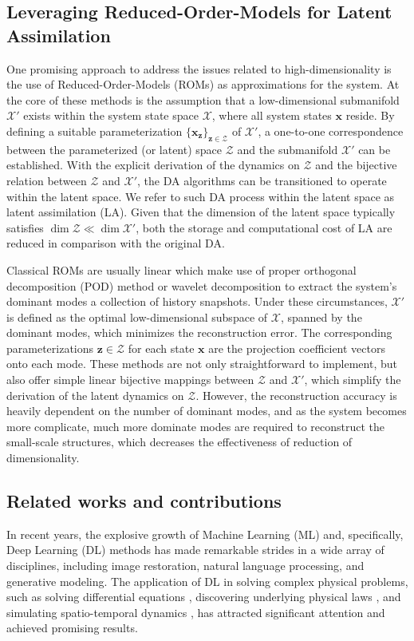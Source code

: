 \documentclass{article}
\newcommand{\mX}{\mathcal{X}}
\newcommand{\mZ}{\mathcal{Z}}
\begin{document}
\subsection{Leveraging Reduced-Order-Models for Latent Assimilation}
One promising approach to address the issues related to high-dimensionality is the use of Reduced-Order-Models (ROMs) as approximations for the system. At the core of these methods is the assumption that a low-dimensional submanifold $\mX'$ exists within the system state space $\mX$, where all system states $\bm x$ reside. By defining a suitable parameterization $\{\bm x_{\bm z}\}_{\bm z\in\mZ}$ of $\mX'$, a one-to-one correspondence between the parameterized (or latent) space $\mZ$ and the submanifold $\mX'$ can be established. With the explicit derivation of the dynamics on $\mZ$ and the bijective relation between $\mZ$ and $\mX'$, the DA algorithms can be transitioned to operate within the latent space. We refer to such DA process within the latent space as latent assimilation (LA). Given that the dimension of the latent space typically satisfies $\dim\mZ\ll\dim\mX'$, both the storage and computational cost of LA are reduced in comparison with the original DA.

Classical ROMs are usually linear which make use of proper orthogonal decomposition (POD) method or wavelet decomposition to extract the system's dominant modes a collection of history snapshots. Under these circumstances, $\mX'$ is defined as the optimal low-dimensional subspace of $\mX$, spanned by the dominant modes, which minimizes the reconstruction error. The corresponding parameterizations $\bm z\in\mZ$ for each state $\bm x$ are the projection coefficient vectors onto each mode. These methods are not only straightforward to implement, but also offer simple linear bijective mappings between $\mZ$ and $\mX'$, which simplify the derivation of the latent dynamics on $\mZ$. However, the reconstruction accuracy is heavily dependent on the number of dominant modes, and as the system becomes more complicate, much more dominate modes are required to reconstruct the small-scale structures, which decreases the effectiveness of reduction of dimensionality.

\subsection{Related works and contributions}
In recent years, the explosive growth of Machine Learning (ML) and, specifically, Deep Learning (DL) methods has made remarkable strides in a wide array of disciplines, including image restoration, natural language processing, and generative modeling. The application of DL in solving complex physical problems, such as solving differential equations \cite{PINNs,DeepRitz,DeepGalerkin}, discovering underlying physical laws \cite{PDENet2.0,SINDy,AI-Feyman}, and simulating spatio-temporal dynamics \cite{DeepONet,FNO}, has attracted significant attention and achieved promising results.
\end{document}
